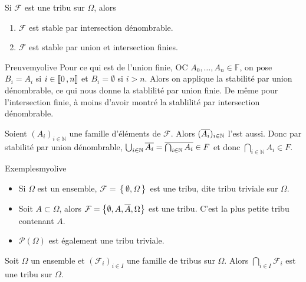     \begin{prop}{}{}
        Si $\mathcal{F}$ est une tribu sur $\Omega$, alors 
        \begin{enumerate}
            \item $\mathcal{F}$ est stable par intersection dénombrable.
            \item $\mathcal{F}$ est stable par union et intersection finies.
        \end{enumerate}
    \end{prop}

    \begin{demo}{Preuve}{myolive}
        Pour ce qui est de l’union finie, OC $A_0, \ldots, A_n \in \mathbb{F}$, on pose $B_i = A_i$ si $i \in \left\llbracket 0 \, , n \right\rrbracket$ et $B_i = \emptyset$ si $i >n$. Alors on applique la stabilité par union dénombrable, ce qui nous donne la stablilité par union finie. De même pour l’intersection finie, à moins d’avoir montré la stablilité par intersection dénombrable.

        Soient $(A_i)_{i \in \mathbb{N}}$ une famille d’éléments de $\mathcal{F}$. Alors $(\overline{A_i})_{i \in \mathbb{N}}$ l’est aussi. Donc par stabilité par union dénombrable, $\bigcup_{i \in \mathbb{N}} \overline{A_i} = \overline{\bigcap_{i \in \mathbb{N}} A_i} \in F$ et donc $\bigcap_{i \in \mathbb{N}} A_i \in F$.
    \end{demo}

    \begin{omed}{Exemples}{myolive}
        \begin{itemize}
            \item Si $\Omega$ est un ensemble, $\mathcal{F} = \left\{\emptyset, \Omega\right\}$ est une tribu, dite tribu triviale sur $\Omega$. 
            \item Soit $A \subset \Omega$, alors $\mathcal{F} = \left\{\emptyset, A, \overline{A}, \Omega\right\}$ est une tribu. C’est la plus petite tribu contenant $A$.
            \item $\mathcal{P}(\Omega)$ est également une tribu triviale.
        \end{itemize}
    \end{omed}

    \begin{prop}{}{}
        Soit $\Omega$ un ensemble et $(\mathcal{F}_i)_{i \in I}$ une famille de tribus sur $\Omega$. Alors $\bigcap_{i \in I} \mathcal{F}_i$ est une tribu sur $\Omega$.
    \end{prop}

